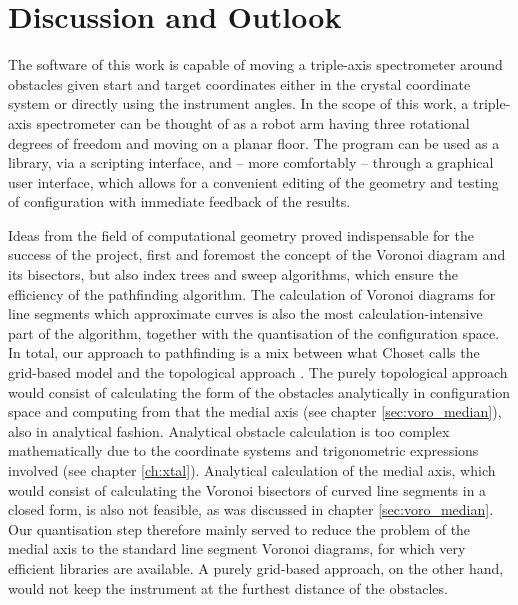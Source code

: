 %
%

\chapter{Discussion and Outlook}
\label{ch:outlook}
The software of this work is capable of moving a triple-axis spectrometer around obstacles 
given start and target coordinates either in the crystal coordinate system or directly using the instrument angles.
In the scope of this work, a triple-axis spectrometer can be thought of as a robot arm having three rotational
degrees of freedom and moving on a planar floor.
The program can be used as a library, via a scripting interface, and -- more comfortably -- through a graphical
user interface, which allows for a convenient editing of the geometry and testing of configuration
with immediate feedback of the results.

Ideas from the field of computational geometry proved indispensable for the success of the project,
first and foremost the concept of the Voronoi diagram and its bisectors, but also index trees and sweep 
algorithms, which ensure the efficiency of the pathfinding algorithm.
The calculation of Voronoi diagrams for line segments which approximate curves is also the most
calculation-intensive part of the algorithm, together with the quantisation of the configuration space.
In total, our approach to pathfinding is a mix between what Choset calls the grid-based model and the
topological approach \cite{Choset2010_ch8}.
The purely topological approach would consist of calculating the form of the obstacles analytically in
configuration space and computing from that the medial axis (see chapter \ref{sec:voro_median}), also
in analytical fashion. 
Analytical obstacle calculation is too complex mathematically due to the coordinate systems and trigonometric
expressions involved (see chapter \ref{ch:xtal}). Analytical calculation of the medial axis, which would consist
of calculating the Voronoi bisectors of curved line segments in a closed form, is also not feasible, 
as was discussed in chapter \ref{sec:voro_median}.
Our quantisation step therefore mainly served to reduce the problem of the medial axis to the standard
line segment Voronoi diagrams, for which very efficient libraries are available. 
A purely grid-based approach, on the other hand, would not keep the instrument at the furthest distance
of the obstacles.

